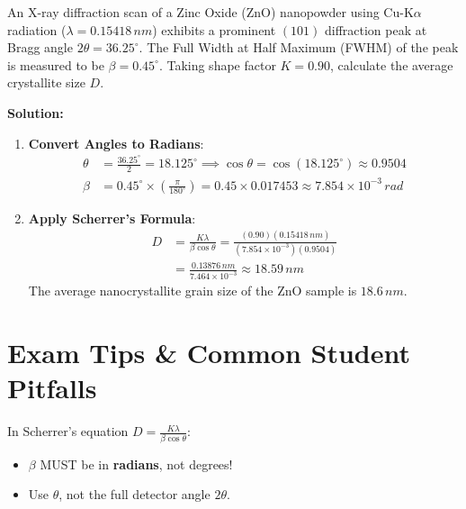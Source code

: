 \begin{example}
An X-ray diffraction scan of a Zinc Oxide ($\text{ZnO}$) nanopowder using $\text{Cu-K}\alpha$ radiation ($\lambda = 0.15418\,\si{nm}$) exhibits a prominent $(101)$ diffraction peak at Bragg angle $2\theta = 36.25^\circ$. The Full Width at Half Maximum (FWHM) of the peak is measured to be $\beta = 0.45^\circ$. Taking shape factor $K = 0.90$, calculate the average crystallite size $D$.

\textbf{Solution:}
\begin{enumerate}
    \item \textbf{Convert Angles to Radians}:
    \begin{align*}
        \theta &= \frac{36.25^\circ}{2} = 18.125^\circ \implies \cos\theta = \cos(18.125^\circ) \approx 0.9504 \\
        \beta &= 0.45^\circ \times \left(\frac{\pi}{180^\circ}\right) = 0.45 \times 0.017453 \approx 7.854 \times 10^{-3}\,\si{rad}
    \end{align*}
    
    \item \textbf{Apply Scherrer's Formula}:
    \begin{align*}
        D &= \frac{K \lambda}{\beta \cos\theta} = \frac{(0.90)(0.15418\,\si{nm})}{(7.854 \times 10^{-3})(0.9504)} \\
        &= \frac{0.13876\,\si{nm}}{7.464 \times 10^{-3}} \approx 18.59\,\si{nm}
    \end{align*}
    The average nanocrystallite grain size of the $\text{ZnO}$ sample is $18.6\,\si{nm}$.
\end{enumerate}
\end{example}

\section{Exam Tips \& Common Student Pitfalls}

\begin{examtip}
In Scherrer's equation $D = \frac{K\lambda}{\beta\cos\theta}$:
\begin{itemize}
    \item $\beta$ MUST be in \textbf{radians}, not degrees!
    \item Use $\theta$, not the full detector angle $2\theta$.
\end{itemize}
\end{examtip}

